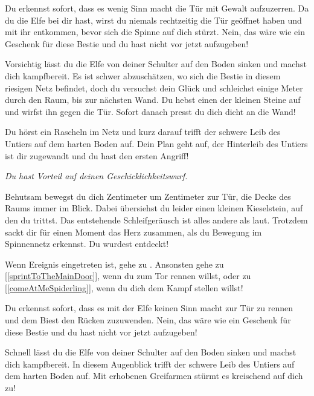 
Du erkennst sofort, dass es wenig Sinn macht die Tür mit Gewalt aufzuzerren. Da du die Elfe bei dir hast, wirst du niemals rechtzeitig die Tür geöffnet haben und mit ihr entkommen, bevor sich die Spinne auf dich stürzt. Nein, das wäre wie ein Geschenk für diese Bestie und du hast nicht vor jetzt aufzugeben!

Vorsichtig lässt du die Elfe von deiner Schulter auf den Boden sinken und machst dich kampfbereit. Es ist schwer abzuschätzen, wo sich die Bestie in diesem riesigen Netz befindet, doch du versuchst dein Glück und schleichst einige Meter durch den Raum, bis zur nächsten Wand. Du hebst einen der kleinen Steine auf und wirfst ihn gegen die Tür. Sofort danach presst du dich dicht an die Wand!

Du hörst ein Rascheln im Netz und kurz darauf trifft der schwere Leib des Untiers auf dem harten Boden auf. Dein Plan geht auf, der Hinterleib des Untiers ist dir zugewandt und du hast den ersten Angriff!

\textit{Du hast Vorteil auf deinen Geschicklichkeitswurf.}



Behutsam bewegst du dich Zentimeter um Zentimeter zur Tür, die Decke des Raums immer im Blick. Dabei übersiehst du leider einen kleinen Kieselstein, auf den du trittst. Das entstehende Schleifgeräusch ist alles andere als laut. Trotzdem sackt dir für einen Moment das Herz zusammen, als du Bewegung im Spinnennetz erkennst. Du wurdest entdeckt!

Wenn Ereignis  eingetreten ist, gehe zu . Ansonsten gehe zu [\ref{sprintToTheMainDoor}], wenn du zum Tor rennen willst, oder zu [\ref{comeAtMeSpiderling}], wenn du dich dem Kampf stellen willst!


Du erkennst sofort, dass es mit der Elfe keinen Sinn macht zur Tür zu rennen und dem Biest den Rücken zuzuwenden. Nein, das wäre wie ein Geschenk für diese Bestie und du hast nicht vor jetzt aufzugeben!

Schnell lässt du die Elfe von deiner Schulter auf den Boden sinken und machst dich kampfbereit. In diesem Augenblick trifft der schwere Leib des Untiers auf dem harten Boden auf. Mit erhobenen Greifarmen stürmt es kreischend auf dich zu!

